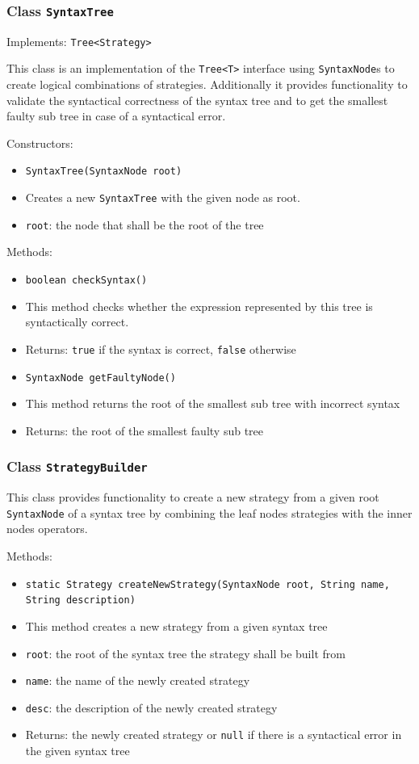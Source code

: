 \documentclass[parskip=full,11pt]{scrartcl}
\begin{document}
\subsubsection{Class \texttt{SyntaxTree}}
Implements: \texttt{Tree<Strategy>}

This class is an implementation of the \texttt{Tree<T>} interface using \texttt{SyntaxNode}s to create logical combinations of strategies. Additionally it provides functionality to validate the syntactical correctness of the syntax tree and to get the smallest faulty sub tree in case of a syntactical error.

Constructors:
\begin{itemize}\itemsep -10pt
	\item \texttt{SyntaxTree(SyntaxNode root)}
	\item[] Creates a new \texttt{SyntaxTree} with the given node as root.
	\item[] \texttt{root}: the node that shall be the root of the tree
\end{itemize}

Methods:
\begin{itemize} \itemsep -10pt
	\item \texttt{boolean checkSyntax()}
	\item[] This method checks whether the expression represented by this tree is syntactically correct.
	\item[] Returns: \texttt{true} if the syntax is correct, \texttt{false} otherwise

	\item \texttt{SyntaxNode getFaultyNode()}
	\item[] This method returns the root of the smallest sub tree with incorrect syntax
	\item[] Returns: the root of the smallest faulty sub tree
\end{itemize}

\subsubsection{Class \texttt{StrategyBuilder}}

This class provides functionality to create a new strategy from a given root \texttt{SyntaxNode} of a syntax tree by combining the leaf nodes strategies with the inner nodes operators.

Methods:
\begin{itemize} \itemsep -10pt
	\item \texttt{static Strategy createNewStrategy(SyntaxNode root, String name, String description)}
	\item[] This method creates a new strategy from a given syntax tree
	\item[] \texttt{root}: the root of the syntax tree the strategy shall be built from
	\item[] \texttt{name}: the name of the newly created strategy
	\item[] \texttt{desc}: the description of the newly created strategy
	\item[] Returns: the newly created strategy or \texttt{null} if there is a syntactical error in the given syntax tree
\end{itemize}
\end{document}
